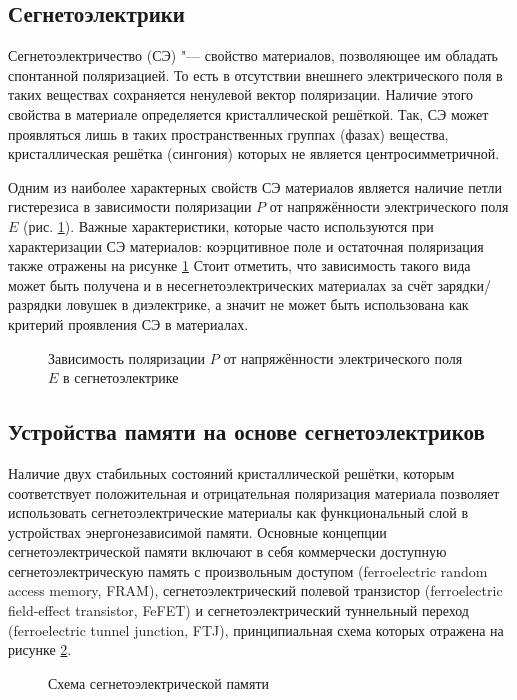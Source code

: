 \subsection{Сегнетоэлектрики}
Сегнетоэлектричество (СЭ) "--- свойство материалов, позволяющее им обладать спонтанной поляризацией. То есть в отсутствии внешнего электрического поля в таких веществах сохраняется ненулевой вектор поляризации. Наличие этого свойства в материале определяется кристаллической решёткой. Так, СЭ может проявляться лишь в таких пространственных группах (фазах) вещества, кристаллическая решётка (сингония) которых не является центросимметричной.

Одним из наиболее характерных свойств СЭ материалов является наличие петли гистерезиса в зависимости поляризации \(P\) от напряжённости электрического поля \(E\) (рис. \cref{fig:hysteresis}). Важные характеристики, которые часто используются при характеризации СЭ материалов: коэрцитивное поле и остаточная поляризация также отражены на рисунке \cref{fig:hysteresis} Стоит отметить, что зависимость такого вида может быть получена и в несегнетоэлектрических материалах за счёт зарядки/разрядки ловушек в диэлектрике, а значит не может быть использована как критерий проявления СЭ в материалах.

\begin{figure}[ht]
    \caption{Зависимость поляризации \(P\) от напряжённости электрического поля \(E\) в сегнетоэлектрике}\label{fig:hysteresis}
\end{figure}

\subsection{Устройства памяти на основе сегнетоэлектриков}
Наличие двух стабильных состояний кристаллической решётки, которым соответствует положительная и отрицательная поляризация материала позволяет использовать сегнетоэлектрические материалы как функциональный слой в устройствах энергонезависимой памяти. Основные концепции сегнетоэлектрической памяти включают в себя коммерчески доступную сегнетоэлектрическую память с произвольным доступом (ferroelectric random access memory, FRAM), сегнетоэлектрический полевой транзистор (ferroelectric field-effect transistor, FeFET) и сегнетоэлектрический туннельный переход (ferroelectric tunnel junction, FTJ), принципиальная схема которых отражена на рисунке \cref{fig:fram}.

\begin{figure}[ht]
    \caption{Схема сегнетоэлектрической памяти}\label{fig:fram}
\end{figure}

\FloatBarrier
